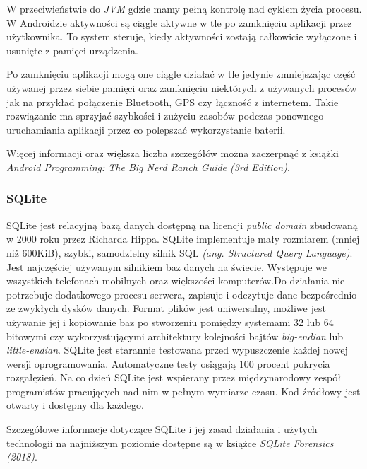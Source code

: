 \documentclass[a4paper,12pt, twoside]{article}
\begin{document}
    	W przeciwieństwie do \textit{JVM} gdzie mamy pełną kontrolę nad cyklem życia procesu. W Androidzie aktywności są ciągle aktywne w tle po zamknięciu aplikacji przez użytkownika. To system steruje, kiedy aktywności zostają całkowicie wyłączone i usunięte z pamięci urządzenia. 
    	
    	Po zamknięciu aplikacji mogą one ciągle działać w tle jedynie zmniejszając część używanej przez siebie pamięci oraz zamknięciu niektórych z używanych procesów jak na przykład połączenie Bluetooth, GPS czy łączność z internetem. Takie rozwiązanie ma sprzyjać szybkości i zużyciu zasobów podczas ponownego uruchamiania aplikacji przez co polepszać wykorzystanie baterii\cite{batterysave}.
    	
    	Więcej informacji oraz większa liczba szczegółów można zaczerpnąć z książki \textit{Android Programming: The Big Nerd Ranch Guide (3rd Edition)}\cite{androidprogramming}.
    	
    	\vspace{1cm}
    	\subsubsection{SQLite}
    	SQLite jest relacyjną bazą danych dostępną na licencji \textit{public domain}\cite{publicdomain} zbudowaną w 2000 roku przez Richarda Hippa. SQLite implementuje mały rozmiarem (mniej niż 600KiB), szybki, samodzielny  silnik SQL \textit{(ang. Structured Query Language)}. Jest najczęściej używanym silnikiem baz danych na świecie. Występuje we wszystkich telefonach mobilnych oraz większości komputerów.Do działania nie potrzebuje dodatkowego procesu serwera, zapisuje i odczytuje dane bezpośrednio ze zwykłych dysków danych. Format plików jest uniwersalny, możliwe jest używanie jej i kopiowanie baz po stworzeniu pomiędzy systemami 32 lub 64 bitowymi czy wykorzystującymi architektury kolejności bajtów \textit{big-endian} lub \textit{little-endian}\cite{endian}. SQLite jest starannie testowana przed wypuszczenie każdej nowej wersji oprogramowania. Automatyczne testy osiągają 100 procent pokrycia rozgałęzień\cite{branchcoverage}. Na co dzień SQLite jest wspierany przez międzynarodowy zespół programistów pracujących nad nim w pełnym wymiarze czasu. Kod źródłowy jest otwarty i dostępny dla każdego\cite{sqlite}.
    	
    	Szczegółowe informacje dotyczące SQLite i jej zasad działania i użytych technologii na najniższym poziomie dostępne są w książce \textit{SQLite Forensics (2018)}\cite{sqliteforensics}. 
    	
\end{document}
